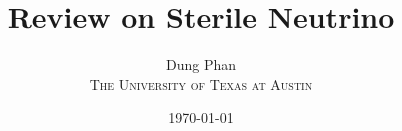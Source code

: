 \documentclass[10pt,fleqn,twocolumn]{article}
\begin{document}
\title{\textbf{Review on Sterile Neutrino}}
\author{Dung Phan\\ \textsc{The University of Texas at Austin}}
\date{\today}
\maketitle





\end{document}
